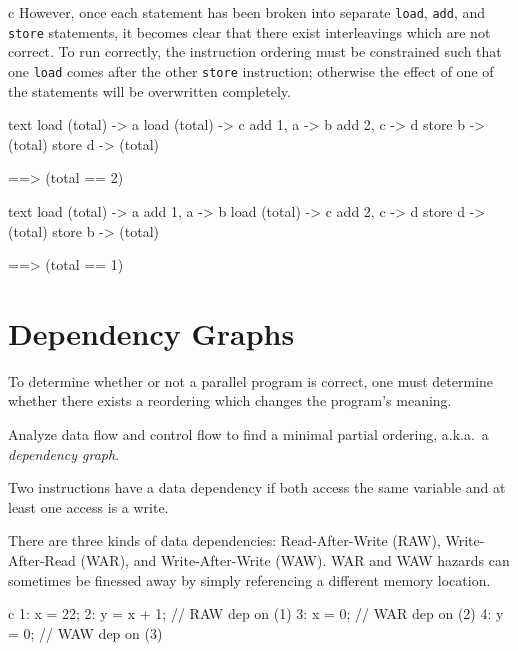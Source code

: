 \documentclass[conference, a4paper]{IEEEtran-modified}
\begin{document}
\begin{ccode}[]{c}
However, once each statement has been broken into separate \texttt{load}, \texttt{add}, and \texttt{store} statements, it becomes clear that there exist interleavings which are not correct. To run correctly, the instruction ordering must be constrained such that one \texttt{load} comes after the other \texttt{store} instruction; otherwise the effect of one of the statements will be overwritten completely.

  
      \begin{ccode}[after skip=4pt]
        {text}
        load (total) -> a
          load (total) -> c
        add 1, a -> b
          add 2, c -> d
        store b -> (total)
          store d -> (total)

          ==> (total == 2)\end{ccode}
      \begin{ccode}[]
        {text}
        load (total) -> a
        add 1, a -> b
          load (total) -> c
          add 2, c -> d
          store d -> (total)
        store b -> (total)
        
          ==> (total == 1)\end{ccode}

  \section{Dependency Graphs}

To determine whether or not a parallel program is correct, one must determine whether there exists a reordering which changes the program's meaning. 


Analyze data flow and control flow to find a minimal partial ordering, a.k.a.\ a \emph{dependency graph}.

Two instructions have a data dependency if both access the same variable and at least one access is a write.

There are three kinds of data dependencies: Read-After-Write (RAW), Write-After-Read (WAR), and Write-After-Write (WAW). WAR and WAW hazards can sometimes be finessed away by simply referencing a different memory location.


      \begin{ccode}[]
        {c}
        1: x = 22;
        2: y = x + 1;     // RAW dep on (1)
        3: x = 0;         // WAR dep on (2)
        4: y = 0;         // WAW dep on (3)
      \end{ccode}



\end{ccode}
\end{document}
